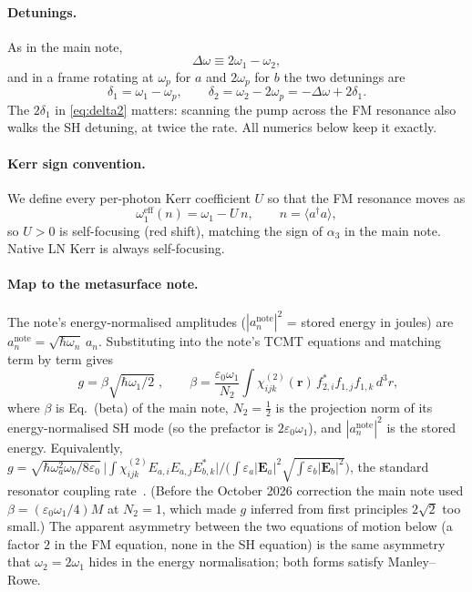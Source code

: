 \documentclass[11pt,a4paper]{article}
\newcommand{\eps}{\varepsilon}
\newcommand{\bvec}[1]{\mathbf{#1}}
\newcommand{\chitwo}{\chi^{(2)}}
\newcommand{\Dom}{\Delta\omega}
\begin{document}
\paragraph{Detunings.}  As in the main note,
\begin{equation}
  \Dom\equiv2\omega_1-\omega_2 ,
\end{equation}
and in a frame rotating at $\omega_p$ for $a$ and $2\omega_p$ for $b$
the two detunings are
\begin{equation}
  \delta_1=\omega_1-\omega_p,\qquad
  \delta_2=\omega_2-2\omega_p=-\Dom+2\delta_1 .
  \label{eq:delta2}
\end{equation}
The $2\delta_1$ in \eqref{eq:delta2} matters: scanning the pump across
the FM resonance also walks the SH detuning, at twice the rate.  All
numerics below keep it exactly.

\paragraph{Kerr sign convention.}  We define every per-photon Kerr
coefficient $U$ so that the FM resonance moves as
\begin{equation}
  \omega_1^{\text{eff}}(n)=\omega_1-U\,n ,\qquad n=\langle a^\dagger a\rangle ,
  \label{eq:Usign}
\end{equation}
so $U>0$ is self-focusing (red shift), matching the sign of $\alpha_3$
in the main note.  Native LN Kerr is always self-focusing.

\paragraph{Map to the metasurface note.}  The note's energy-normalised
amplitudes ($|a_n^{\text{note}}|^2$ = stored energy in joules) are
$a_n^{\text{note}}=\sqrt{\hbar\omega_n}\,a_n$.  Substituting into the
note's TCMT equations and matching term by term gives
\begin{equation}
  \boxed{\;g=\beta\sqrt{\hbar\omega_1/2}\;},\qquad
  \beta=\frac{\eps_0\omega_1}{N_2}\!\int\!\chitwo_{ijk}(\bvec r)\,
        f^*_{2,i}f_{1,j}f_{1,k}\,d^3r ,
  \label{eq:g-beta}
\end{equation}
where $\beta$ is Eq.~(beta) of the main note, $N_2=\tfrac12$ is the
projection norm of its energy-normalised SH mode (so the prefactor is
$2\eps_0\omega_1$), and $|a_n^{\text{note}}|^2$ is the stored energy.
Equivalently,
$g=\sqrt{\hbar\omega_a^2\omega_b/8\eps_0}\,
\bigl|\int\chitwo_{ijk}E_{a,i}E_{a,j}E_{b,k}^*\bigr|/
\bigl(\int\eps_a|\mathbf E_a|^2\sqrt{\int\eps_b|\mathbf E_b|^2}\bigr)$,
the standard resonator coupling rate~\cite{Zhao2021}.  (Before the
October 2026 correction the main note used $\beta=(\eps_0\omega_1/4)M$
at $N_2=1$, which made $g$ inferred from first principles $2\sqrt2$ too
small.)  The apparent asymmetry
between the two equations of motion below (a factor $2$ in the FM
equation, none in the SH equation) is the same asymmetry that
$\omega_2=2\omega_1$ hides in the energy normalisation; both forms
satisfy Manley--Rowe.
\end{document}

